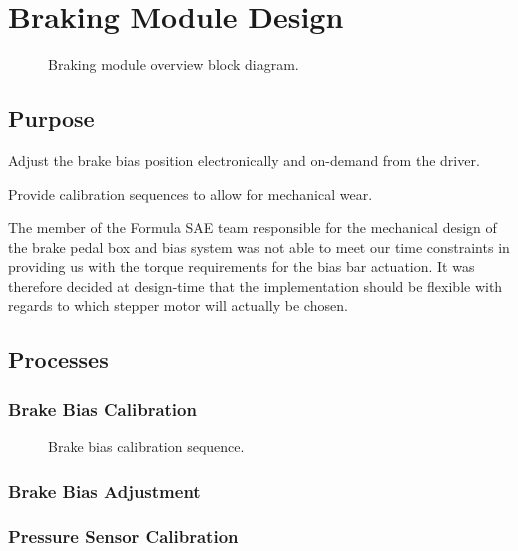\section{Braking Module Design\label{sec:Braking-Module-Design}}

\begin{figure}[H]
\centering

\caption{Braking module overview block diagram.}
\label{fig:pneumatics_design}
\end{figure}


\subsection{Purpose}

Adjust the brake bias position electronically and on-demand from the driver.

Provide calibration sequences to allow for mechanical wear.

The member of the Formula SAE team responsible for the mechanical design of the brake pedal box and bias system was not able to meet our time constraints in providing us with the torque requirements for the bias bar actuation. It was therefore decided at design-time that the implementation should be flexible with regards to which stepper motor will actually be chosen.


\subsection{Processes}


\subsubsection{Brake Bias Calibration}

\begin{figure}
\centering

\caption{Brake bias calibration sequence.}
\label{fig:pneumatics_design}
\end{figure}

\subsubsection{Brake Bias Adjustment}


\subsubsection{Pressure Sensor Calibration}

